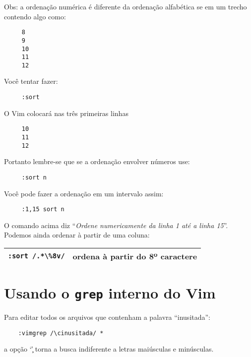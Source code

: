 Obs: a ordenação numérica é diferente da ordenação alfabética se em um
trecho contendo algo como:

\begin{verbatim}
     8
     9
     10
     11
     12
\end{verbatim}

Você tentar fazer:

\begin{verbatim}
     :sort
\end{verbatim}

O Vim colocará nas três primeiras linhas

\begin{verbatim}
     10
     11
     12
\end{verbatim}

Portanto lembre-se que se a ordenação envolver números use:

\begin{verbatim}
     :sort n
\end{verbatim}

Você pode fazer a ordenação em um intervalo assim:

\begin{verbatim}
     :1,15 sort n
\end{verbatim}

O comando acima diz ``{\em Ordene numericamente da linha 1 até a linha 15}''.  
Podemos ainda ordenar à partir de uma coluna:

\begin{table}[htb]\begin{center} \begin{tabular}{ll} \hline
     \verb|:sort /.*\%8v/| & ordena à partir do 8º caractere\\
\hline \end{tabular}\end{center}\end{table}

\section{Usando o \texttt{grep} interno do Vim}
\label{sec:Usando o grep interno do Vim}

Para editar todos os arquivos que contenham a palavra ``inusitada'':

\begin{verbatim}
    :vimgrep /\cinusitada/ *
\end{verbatim}
a opção `\c' torna a busca indiferente a letras maiúsculas e minúsculas.

